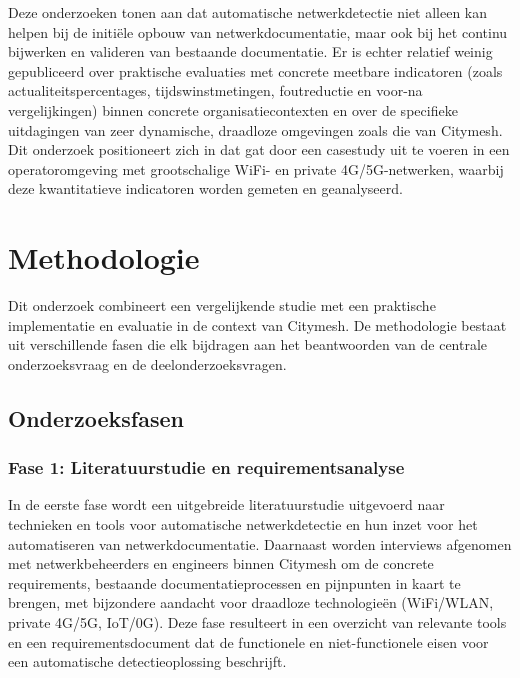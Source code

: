 Deze onderzoeken tonen aan dat automatische netwerkdetectie niet alleen kan helpen bij de initiële opbouw van netwerkdocumentatie, maar ook bij het continu bijwerken en valideren van bestaande documentatie. Er is echter relatief weinig gepubliceerd over praktische evaluaties met concrete meetbare indicatoren (zoals actualiteitspercentages, tijdswinstmetingen, foutreductie en voor-na vergelijkingen) binnen concrete organisatiecontexten en over de specifieke uitdagingen van zeer dynamische, draadloze omgevingen zoals die van Citymesh. Dit onderzoek positioneert zich in dat gat door een casestudy uit te voeren in een operatoromgeving met grootschalige WiFi- en private 4G/5G-netwerken, waarbij deze kwantitatieve indicatoren worden gemeten en geanalyseerd.

\section{Methodologie}%
\label{sec:methodologie}

Dit onderzoek combineert een vergelijkende studie met een praktische implementatie en evaluatie in de context van Citymesh. De methodologie bestaat uit verschillende fasen die elk bijdragen aan het beantwoorden van de centrale onderzoeksvraag en de deelonderzoeksvragen.

\subsection{Onderzoeksfasen}

\subsubsection{Fase 1: Literatuurstudie en requirementsanalyse}

In de eerste fase wordt een uitgebreide literatuurstudie uitgevoerd naar technieken en tools voor automatische netwerkdetectie en hun inzet voor het automatiseren van netwerkdocumentatie.\autocite{Campbell2007,AutomaticTopology2013,WirelessTopology2015} Daarnaast worden interviews afgenomen met netwerkbeheerders en engineers binnen Citymesh om de concrete requirements, bestaande documentatieprocessen en pijnpunten in kaart te brengen, met bijzondere aandacht voor draadloze technologieën (WiFi/WLAN, private 4G/5G, IoT/0G). Deze fase resulteert in een overzicht van relevante tools en een requirementsdocument dat de functionele en niet-functionele eisen voor een automatische detectieoplossing beschrijft.

